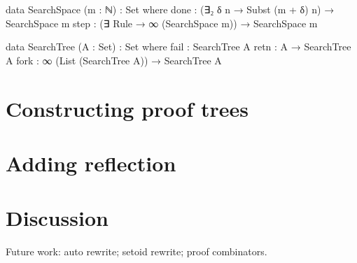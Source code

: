 \documentclass[preprint]{sigplanconf}
\begin{document}
\begin{code}
  data SearchSpace (m : ℕ) : Set where
    done : (∃₂ δ n → Subst (m + δ) n) → SearchSpace m
    step : (∃ Rule → ∞ (SearchSpace m)) → SearchSpace m
\end{code}

\begin{code}
  data SearchTree (A : Set) : Set where
    fail : SearchTree A
    retn : A → SearchTree A
    fork : ∞ (List (SearchTree A)) → SearchTree A
\end{code}


\section{Constructing proof trees}
\label{sec:proofs}

\section{Adding reflection}
\label{sec:reflection}

\section{Discussion}
\label{sec:discussion}


Future work: auto rewrite; setoid rewrite; proof combinators.



\end{document}
